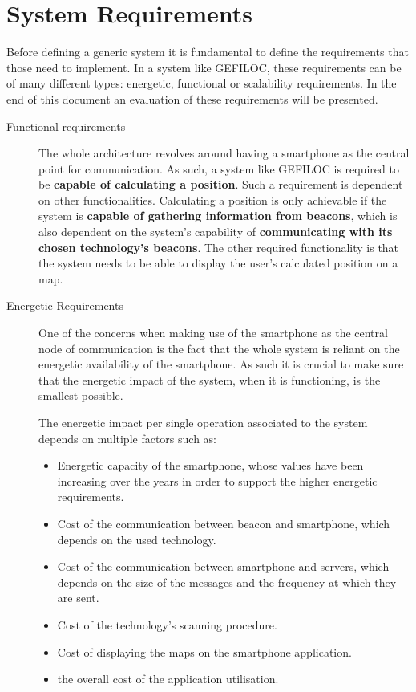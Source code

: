 \section{System Requirements} 
\label{sec:requirements} 
 
 
Before defining a generic system it is fundamental to define the requirements that those need to implement. In a system like GEFILOC, these requirements can be of many different types: energetic, functional or scalability requirements. In the end of this document an evaluation of these requirements will be presented. 
 
 
\begin{description} 
\item [Functional requirements] The whole architecture revolves around having a smartphone as the central point for communication. As such, a system like GEFILOC is required to be \textbf{capable of calculating a position}. Such a requirement is dependent on other functionalities. Calculating a position is only achievable if the system is \textbf{capable of gathering information from beacons}, which is also dependent on the system's capability of \textbf{communicating with its chosen technology's beacons}. The other required functionality is that the system needs to be able to display the user's calculated position on a map.  
 
 
 
 
\item [Energetic Requirements] One of the concerns when making use of the smartphone as the central node of communication is the fact that the whole system is reliant on the energetic availability of the smartphone. As such it is crucial to make sure that the energetic impact of the system, when it is functioning, is the smallest possible. 
 
 
The energetic impact per single operation associated to the system depends on multiple factors such as: 
\begin{itemize} 
\item  Energetic capacity of the smartphone, whose values have been increasing over the years in order to support the higher energetic requirements. 
\item Cost of the communication between beacon and smartphone, which depends on the used technology. 
\item Cost of the communication between smartphone and servers, which depends on the size of the messages and the frequency at which they are sent. 
\item Cost of the technology's scanning procedure. 
\item Cost of displaying the maps on the smartphone application. 
\item the overall cost of the application utilisation. 
\end{itemize} 
 

\end{description}
